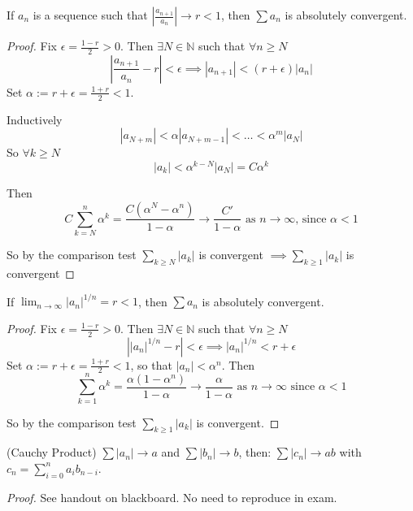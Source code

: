 \begin{theorem}
If $a_n$ is a sequence such that $\left|\frac{a_{n+1}}{a_n}\right| \to r < 1$, then $\sum a_n$ is absolutely convergent.	
\end{theorem}
\begin{proof}
Fix $\epsilon = \frac{1-r}{2} > 0$. Then $\exists N \in \mathbb{N}$ such that $\forall n \geq N$
\[\left|\frac{a_{n+1}}{a_n} - r\right| < \epsilon \implies |a_{n+1}| < (r + \epsilon)|a_n|\]
Set $\alpha := r + \epsilon = \frac{1 + r}{2} < 1$. 

Inductively
\[|a_{N+m}| < \alpha|a_{N+m-1}| < \dots < \alpha^m|a_N|\]	
So $\forall k \geq N$ \[|a_k| <  \alpha^{k-N}|a_N| = C\alpha^k\]

Then \[C\sum_{k=N}^{n} \alpha^k = \frac{C(\alpha^N-\alpha^n)}{1-\alpha} \to \frac{C'}{1-\alpha} \text{ as } n \to \infty \text{, since } \alpha < 1\]

So by the comparison test $\sum_{k\geq N} |a_k|$ is convergent $\implies \sum_{k\geq 1} |a_k|$ is convergent
\end{proof}


\begin{theorem}
If $\lim_{n\to \infty} |a_n|^{1/n} = r < 1$, then $\sum a_n$ is absolutely convergent.	
\end{theorem}
\begin{proof}
Fix $\epsilon = \frac{1-r}{2} > 0$. Then $\exists N \in \mathbb{N}$ such that $\forall n \geq N$
\[\left||a_n|^{1/n} - r\right| < \epsilon \implies |a_n|^{1/n} < r + \epsilon\]
Set $\alpha := r + \epsilon = \frac{1 + r}{2} < 1$, so that $|a_n| < \alpha^n$. Then
\[ \sum_{k=1}^n\alpha^k = \frac{\alpha(1-\alpha^n)}{1-\alpha}  \to \frac{\alpha}{1-\alpha} \text{ as } n \to \infty \text{ since } \alpha < 1\]

So by the comparison test $\sum_{k\geq 1} |a_k|$ is convergent.
\end{proof}





\vspace*{5pt}

\begin{theorem}(Cauchy Product) $\sum |a_n| \to a$ and $\sum |b_n| \to b$, then: $\sum |c_n| \to ab$ with $c_n = \sum_{i=0}^n a_ib_{n-i}$.
	
\end{theorem}
\noindent \textit{Proof.}
See handout on blackboard. No need to reproduce in exam. \\

